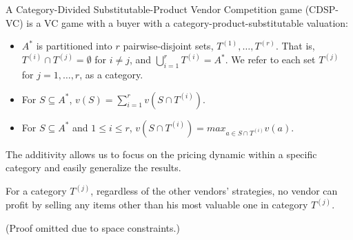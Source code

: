 \begin{definition}
A Category-Divided Substitutable-Product Vendor Competition game (CDSP-VC) is a VC game with a buyer with a category-product-substitutable valuation: 
\begin{itemize}
\item $A^*$ is partitioned into $r$ pairwise-disjoint sets, $T^{(1)},\ldots, T^{(r)}$. That is, $T^{(i)}\cap T^{(j)}=\emptyset$ for $i\neq j$, and $\bigcup_{i=1}^{r}T^{(i)}=A^*$. We refer to each set $T^{(j)}$ for $j=1,\ldots,r$, as a category.
\item For $S\subseteq A^*$, $v(S)=\sum_{i=1}^{r}v(S\cap T^{(i)})$.
\item For $S\subseteq A^*$ and $1\leq i\leq r$, $v(S\cap T^{(i)})=max_{a\in S\cap T^{(i)}}v(a)$.
\end{itemize}
\end{definition}
The additivity allows us to focus on the pricing dynamic within a specific category and easily generalize the results.
\begin{observation}
\label{obs:single_item_sell}
For a category $T^{(j)}$, regardless of the other vendors' strategies, no vendor can profit by selling any items other than his most valuable one in category $T^{(j)}$.
\end{observation}
(Proof omitted due to space constraints.)\\
